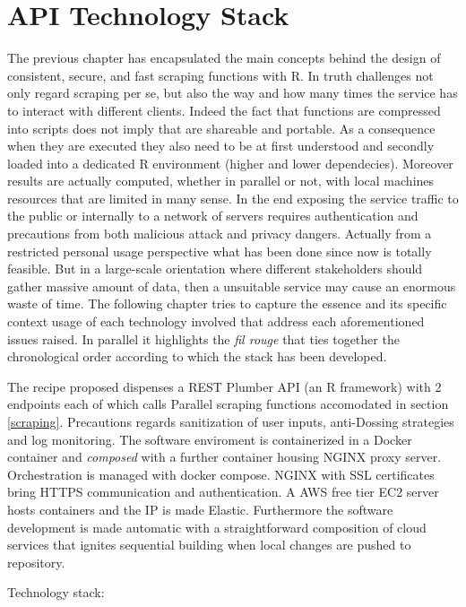 \documentclass[
  12pt,
  a4paper,
  oneside]{book}
\theoremstyle{definition}
\theoremstyle{definition}
\theoremstyle{definition}
\theoremstyle{remark}
\begin{document}
\hypertarget{Infrastructure}{%
\chapter{API Technology Stack}\label{Infrastructure}}

The previous chapter has encapsulated the main concepts behind the design of consistent, secure, and fast scraping functions with R. In truth challenges not only regard scraping per se, but also the way and how many times the service has to interact with different clients. Indeed the fact that functions are compressed into scripts does not imply that are shareable and portable. As a consequence when they are executed they also need to be at first understood and secondly loaded into a dedicated R environment (higher and lower dependecies). Moreover results are actually computed, whether in parallel or not, with local machines resources that are limited in many sense. In the end exposing the service traffic to the public or internally to a network of servers requires authentication and precautions from both malicious attack and privacy dangers. Actually from a restricted personal usage perspective what has been done since now is totally feasible. But in a large-scale orientation where different stakeholders should gather massive amount of data, then a unsuitable service may cause an enormous waste of time.
The following chapter tries to capture the essence and its specific context usage of each technology involved that address each aforementioned issues raised. In parallel it highlights the \emph{fil rouge} that ties together the chronological order according to which the stack has been developed.

The recipe proposed dispenses a REST Plumber API (an R framework) with 2 endpoints each of which calls Parallel scraping functions accomodated in section \ref{scraping}. Precautions regards sanitization of user inputs, anti-Dossing strategies and log monitoring. The software enviroment is containerized in a Docker container and \emph{composed} with a further container housing NGINX proxy server. Orchestration is managed with docker compose. NGINX with SSL certificates bring HTTPS communication and authentication. A AWS free tier EC2 server hosts containers and the IP is made Elastic. Furthermore the software development is made automatic with a straightforward composition of cloud services that ignites sequential building when local changes are pushed to repository.

Technology stack:
\end{document}
